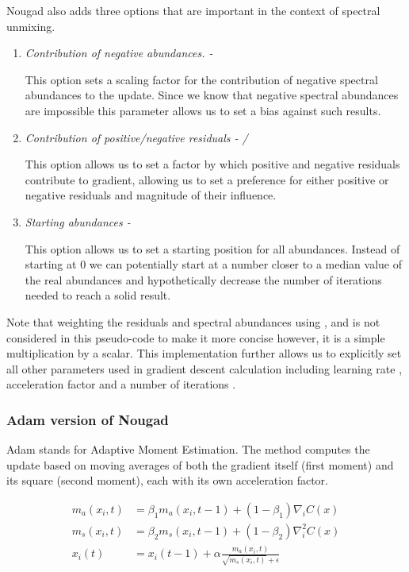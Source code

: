 Nougad also adds three options that are important in the context of spectral unmixing. 
\begin{enumerate}
    \item \emph{Contribution of negative abundances. - }
    
    This option sets a scaling factor for the contribution of negative spectral abundances to the update.
    Since we know that negative spectral abundances are impossible this parameter allows us to set a bias against such results.
    \item \emph{Contribution of positive/negative residuals - /}
    
    This option allows us to set a factor by which positive and negative residuals contribute to gradient, allowing us to set a preference for either positive or negative residuals and magnitude of their influence.
    \item \emph{Starting abundances - }
    
    This option allows us to set a starting position for all abundances. Instead of starting at 0 we can potentially start at a number closer to a median value of the real abundances and hypothetically decrease the number of iterations needed to reach a solid result.
\end{enumerate}

Note that weighting the residuals and spectral abundances using ,  and  is not considered in this pseudo-code to make it more concise however, it is a simple multiplication by a scalar. This implementation further allows us to explicitly set all other parameters used in gradient descent calculation including learning rate , acceleration factor  and a number of iterations .

\subsubsection{Adam version of Nougad}
Adam stands for Adaptive Moment Estimation. The method computes the update based on moving averages of both the gradient itself (first moment) and its square (second moment), each with its own acceleration factor. 

\begin{equation}
\begin{aligned}
m_a(x_i,t) &= \beta_1 m_a(x_i,t-1)+(1-\beta_1)\nabla_iC(x)\\
m_s(x_i,t) &= \beta_2 m_s(x_i,t-1)+(1-\beta_2)\nabla_i^2C(x)\\
x_i(t) &= x_i(t-1)+\alpha \frac{m_a(x_i,t)}{\sqrt{m_s(x_i,t)}+\epsilon}
\end{aligned}
\label{eq:adam}
\end{equation}



